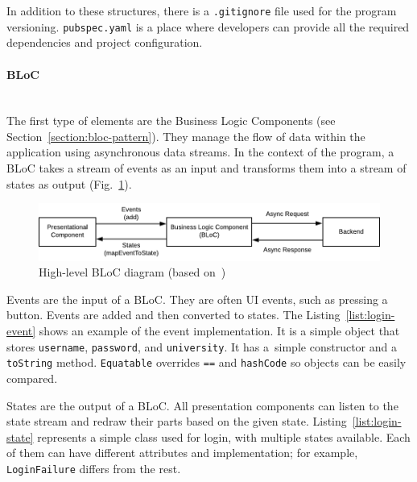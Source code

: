 In addition to these structures, there is a \texttt{.gitignore} file used for the program versioning. \texttt{pubspec.yaml} is a place where developers can provide all the required dependencies and project configuration.


\paragraph{\large{BLoC}}\mbox{}\\[2pt]
The first type of elements are the Business Logic Components (see Section~\ref{section:bloc-pattern}). They manage the flow of data within the application using asynchronous data streams. In the context of the program, a BLoC takes a stream of events as an input and transforms them into a stream of states as output (Fig.~\ref{fig:bloc-diagram}).

\begin{figure}[htb]
    \centering
    \includegraphics[]{fig04/bloc_diagram.pdf}
    \caption{High-level BLoC diagram (based on~\cite{bloc-diagram})}
    \label{fig:bloc-diagram}
\end{figure}

Events are the input of a BLoC. They are often UI events, such as pressing a button. Events are added and then converted to states. The Listing~\ref{list:login-event} shows an example of the event implementation. It is a simple object that stores \texttt{username}, \texttt{password}, and \texttt{university}. It has a~simple constructor and a \texttt{toString} method. \texttt{Equatable} overrides \texttt{==} and \texttt{hashCode} so objects can be easily compared.



States are the output of a BLoC. All presentation components can listen to the state stream and redraw their parts based on the given state. Listing~\ref{list:login-state} represents a simple class used for login, with multiple states available. Each of them can have different attributes and implementation; for example, \texttt{LoginFailure} differs from the rest.

